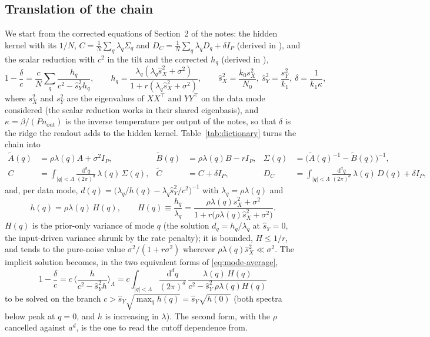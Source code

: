 \documentclass[11pt,a4paper]{article}
\newcommand{\dd}{\mathrm d}
\newcommand{\Lam}{\Lambda}
\newcommand{\At}{\tilde A}
\newcommand{\Bt}{\tilde B}
\newcommand{\Ct}{\tilde C}
\newcommand{\sX}{\hat s_X}
\newcommand{\sY}{\hat s_Y}
\newcommand{\ball}[1]{\int_{|q|<\Lam}\frac{\dd^d q}{(2\pi)^d}\,#1}
\newcommand{\avg}[1]{\big\langle #1 \big\rangle_{\Lam}}
\begin{document}
\subsection{Translation of the chain}
We start from the corrected equations of Section~2 of the notes: the hidden kernel with its $1/N$, $C = \frac1N\sum_q\lambda_q\Sigma_q$ and $D_C = \frac1N\sum_q\lambda_qD_q + \delta I_P$ (derived in ), and the scalar reduction with $c^2$ in the tilt and the corrected $h_q$ (derived in ),
\begin{equation}
  1-\frac{\delta}{c} = \frac cN\sum_q\frac{h_q}{c^2-\sY^2h_q},
  \qquad
  h_q = \frac{\lambda_q(\lambda_q\sX^2+\sigma^2)}{1+r(\lambda_q\sX^2+\sigma^2)},
  \qquad
  \sX^2 = \frac{k_0s_X^2}{N_0},\ \sY^2 = \frac{s_Y^2}{k_1},\ \delta = \frac1{k_1\kappa},
  \label{eq:linear-soln-lattice}
\end{equation}
where $s_X^2$ and $s_Y^2$ are the eigenvalues of $XX^{\top}$ and $YY^{\top}$ on the data mode considered (the scalar reduction works in their shared eigenbasis), and $\kappa = \beta/(Pn_{\mathrm{out}})$ is the inverse temperature per output of the notes, so that $\delta$ is the ridge the readout adds to the hidden kernel.
Table~\ref{tab:dictionary} turns the chain into
\begin{align}
  \At(q) &= \rho\lambda(q)A + \sigma^2I_P, &
  \Bt(q) &= \rho\lambda(q)B - rI_P, &
  \Sigma(q) &= \big(\At(q)^{-1}-\Bt(q)\big)^{-1},\\
  C &= \ball{\lambda(q)\,\Sigma(q)}, &
  \Ct &= C+\delta I_P, &
  D_C &= \ball{\lambda(q)\,D(q)} + \delta I_P ,
  \label{eq:C-cont}
\end{align}
and, per data mode, $d(q) = \big(\lambda_q/h(q) - \lambda_q\sY^2/c^2\big)^{-1}$ with $\lambda_q = \rho\lambda(q)$ and
\begin{equation}
  h(q) = \rho\lambda(q)\,H(q),
  \qquad
  H(q) \equiv \frac{h_q}{\lambda_q} = \frac{\rho\lambda(q)\sX^2+\sigma^2}{1+r\big(\rho\lambda(q)\sX^2+\sigma^2\big)} .
  \label{eq:H}
\end{equation}
$H(q)$ is the prior-only variance of mode $q$ (the solution $d_q = h_q/\lambda_q$ at $\sY = 0$, the input-driven variance shrunk by the rate penalty); it is bounded, $H\le1/r$, and tends to the pure-noise value $\sigma^2/(1+r\sigma^2)$ wherever $\rho\lambda(q)\sX^2\ll\sigma^2$. The implicit solution becomes, in the two equivalent forms of \eqref{eq:mode-average},
\begin{equation}
  \boxed{\;
  1-\frac{\delta}{c} = c\,\avg{\frac{h}{c^2-\sY^2h}}
  = c\ball{\frac{\lambda(q)\,H(q)}{c^2-\sY^2\,\rho\lambda(q)H(q)}}
  \;}
  \label{eq:linear-soln-cont}
\end{equation}
to be solved on the branch $c>\sY\sqrt{\max_qh(q)} = \sY\sqrt{h(0)}$ (both spectra below peak at $q=0$, and $h$ is increasing in $\lambda$). The second form, with the $\rho$ cancelled against $a^d$, is the one to read the cutoff dependence from.
\end{document}
